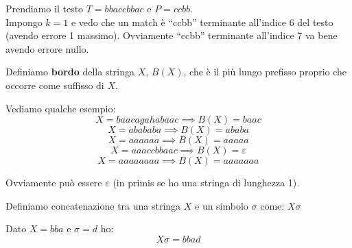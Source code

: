 \documentclass[a4paper,12pt, oneside]{book}
\begin{document}
\begin{esempio}
  Prendiamo il testo $T=bbaccbbac$ e $P=ccbb$.\\
  Impongo $k=1$ e vedo che un match è ``ccbb'' terminante all'indice 6 del testo
  (avendo errore 1 massimo). Ovviamente ``ccbb'' terminante all'indice 7 va bene
  avendo errore nullo.\\
  
\end{esempio}
\begin{definizione}
  Definiamo \textbf{bordo} della stringa $X$, $B(X)$, che è il più lungo
  prefisso proprio che occorre come suffisso di $X$.
  \begin{esempio}
    Vediamo qualche esempio:
    \[X=baacagahabaac\implies B(X)=baac\]
    \[X=abababa\implies B(X)=ababa\]
    \[X=aaaaaa\implies B(X)=aaaaa\]
    \[X=aaaccbbaac\implies B(X)=\varepsilon\]
    \[X=aaaaaaaa\implies B(X)=aaaaaaa\]
  \end{esempio}
  Ovviamente può essere $\varepsilon$ (in primis se ho una stringa di lunghezza
  1).
\end{definizione}
\begin{definizione}
  Definiamo concatenazione tra una stringa $X$ e un simbolo $\sigma$ come:
  $X\sigma$
\end{definizione}
\begin{esempio}
  Dato $X=bba$ e $\sigma=d$ ho:
  \[X\sigma = bbad\]
\end{esempio}
\end{document}
